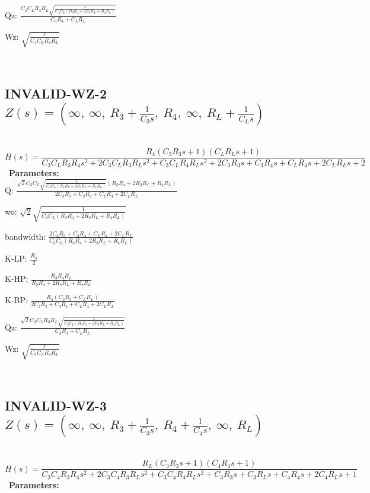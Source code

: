 \documentclass{article}
\begin{document}
Qz: $\frac{C_{4} C_{L} R_{4} R_{L} \sqrt{\frac{1}{C_{4} C_{L} \left(R_{3} R_{4} + 2 R_{3} R_{L} + R_{4} R_{L}\right)}}}{C_{4} R_{4} + C_{L} R_{L}}$\ 

Wz: $\sqrt{\frac{1}{C_{4} C_{L} R_{4} R_{L}}}$\ 

\ 

\subsection{INVALID-WZ-2 $Z(s) = \left( \infty, \  \infty, \  R_{3} + \frac{1}{C_{3} s}, \  R_{4}, \  \infty, \  R_{L} + \frac{1}{C_{L} s}\right)$ } \ 
\textbf{\[H(s) = \frac{R_{4} \left(C_{3} R_{3} s + 1\right) \left(C_{L} R_{L} s + 1\right)}{C_{3} C_{L} R_{3} R_{4} s^{2} + 2 C_{3} C_{L} R_{3} R_{L} s^{2} + C_{3} C_{L} R_{4} R_{L} s^{2} + 2 C_{3} R_{3} s + C_{3} R_{4} s + C_{L} R_{4} s + 2 C_{L} R_{L} s + 2}\] } \ 
\textbf{Parameters:}\\ 

Q: $\frac{\sqrt{2} C_{3} C_{L} \sqrt{\frac{1}{C_{3} C_{L} \left(R_{3} R_{4} + 2 R_{3} R_{L} + R_{4} R_{L}\right)}} \left(R_{3} R_{4} + 2 R_{3} R_{L} + R_{4} R_{L}\right)}{2 C_{3} R_{3} + C_{3} R_{4} + C_{L} R_{4} + 2 C_{L} R_{L}}$\ 

wo: $\sqrt{2} \sqrt{\frac{1}{C_{3} C_{L} \left(R_{3} R_{4} + 2 R_{3} R_{L} + R_{4} R_{L}\right)}}$\ 

bandwidth: $\frac{2 C_{3} R_{3} + C_{3} R_{4} + C_{L} R_{4} + 2 C_{L} R_{L}}{C_{3} C_{L} \left(R_{3} R_{4} + 2 R_{3} R_{L} + R_{4} R_{L}\right)}$\ 

K-LP: $\frac{R_{4}}{2}$\ 

K-HP: $\frac{R_{3} R_{4} R_{L}}{R_{3} R_{4} + 2 R_{3} R_{L} + R_{4} R_{L}}$\ 

K-BP: $\frac{R_{4} \left(C_{3} R_{3} + C_{L} R_{L}\right)}{2 C_{3} R_{3} + C_{3} R_{4} + C_{L} R_{4} + 2 C_{L} R_{L}}$\ 

Qz: $\frac{\sqrt{2} C_{3} C_{L} R_{3} R_{L} \sqrt{\frac{1}{C_{3} C_{L} \left(R_{3} R_{4} + 2 R_{3} R_{L} + R_{4} R_{L}\right)}}}{C_{3} R_{3} + C_{L} R_{L}}$\ 

Wz: $\sqrt{\frac{1}{C_{3} C_{L} R_{3} R_{L}}}$\ 

\ 

\subsection{INVALID-WZ-3 $Z(s) = \left( \infty, \  \infty, \  R_{3} + \frac{1}{C_{3} s}, \  R_{4} + \frac{1}{C_{4} s}, \  \infty, \  R_{L}\right)$ } \ 
\textbf{\[H(s) = \frac{R_{L} \left(C_{3} R_{3} s + 1\right) \left(C_{4} R_{4} s + 1\right)}{C_{3} C_{4} R_{3} R_{4} s^{2} + 2 C_{3} C_{4} R_{3} R_{L} s^{2} + C_{3} C_{4} R_{4} R_{L} s^{2} + C_{3} R_{3} s + C_{3} R_{L} s + C_{4} R_{4} s + 2 C_{4} R_{L} s + 1}\] } \ 
\textbf{Parameters:}\\ 
\end{document}
